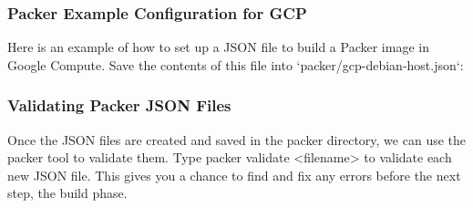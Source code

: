 \hypertarget{packer-example-configuration-for-gcp}{%
\subsubsection{Packer Example Configuration for
GCP}\label{packer-example-configuration-for-gcp}}

Here is an example of how to set up a JSON file to build a Packer image
in Google Compute. Save the contents of this file into
`packer/gcp-debian-host.json`:

\begin{Shaded}
\begin{Highlighting}[]
\KeywordTok{\{}
   \NormalTok{:}\BuiltInTok{ [}
\NormalTok{      \{}
         \NormalTok{: }\NormalTok{,}
         \NormalTok{: }\NormalTok{,}
         \NormalTok{: }\NormalTok{,}
         \NormalTok{: }\NormalTok{,}
         \NormalTok{: }\NormalTok{,}
         \NormalTok{: }\NormalTok{,}
         \NormalTok{: }\NormalTok{,}
         \NormalTok{: }\NormalTok{,}
         \NormalTok{: \{ }\NormalTok{: }\NormalTok{ \}}
\NormalTok{      \}}
\NormalTok{   ],}
   \NormalTok{: [}
\NormalTok{      \{}
         \NormalTok{: }\NormalTok{,}
         \NormalTok{: [}
         \NormalTok{,}
         \NormalTok{,}
\NormalTok{         ]}
\NormalTok{      \}}
\NormalTok{   ]}
\NormalTok{\}}
\end{Highlighting}
\end{Shaded}

\hypertarget{validating-packer-json-files}{%
\subsubsection{Validating Packer JSON
Files}\label{validating-packer-json-files}}

Once the JSON files are created and saved in the packer directory, we
can use the packer tool to validate them. Type
packer validate \textless{}filename\textgreater{} to validate each new
JSON file. This gives you a chance to find and fix any errors before the
next step, the build phase.

